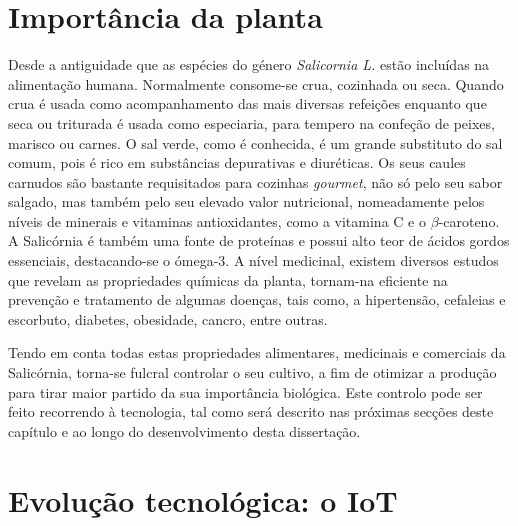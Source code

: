 \section{Importância da planta}



Desde a antiguidade que as espécies do género \textit{Salicornia L.} estão incluídas na alimentação humana. Normalmente consome-se crua, cozinhada ou seca. Quando crua é usada como acompanhamento das mais diversas refeições enquanto que seca ou triturada é usada como especiaria, para tempero na confeção de peixes, marisco ou carnes. O sal verde, como é conhecida, é um grande substituto do sal comum, pois é rico em substâncias depurativas e diuréticas. Os seus caules carnudos são bastante requisitados para cozinhas \textit{gourmet}, não só pelo seu sabor salgado, mas também pelo seu elevado valor nutricional\cite{Filomena2009}, nomeadamente pelos níveis de minerais e vitaminas antioxidantes, como a  vitamina C e o $\beta$-caroteno. A Salicórnia é também uma fonte de proteínas e possui alto teor de ácidos gordos essenciais, destacando-se o  ómega-3\cite{Ventura2011}. A nível medicinal, existem diversos estudos que revelam as propriedades químicas da planta, tornam-na eficiente na prevenção e tratamento de algumas doenças, tais como, a hipertensão, cefaleias e escorbuto, diabetes, obesidade, cancro, entre outras\cite{Wang2012}.

Tendo em conta todas estas propriedades alimentares, medicinais e comerciais da Salicórnia, torna-se fulcral controlar o seu cultivo, a fim de otimizar a produção para tirar maior partido da sua importância biológica. Este controlo pode ser feito recorrendo à tecnologia, tal como será descrito nas próximas secções deste capítulo e ao longo do desenvolvimento desta dissertação.  




















\section{Evolução tecnológica: o \acl{IoT}}


